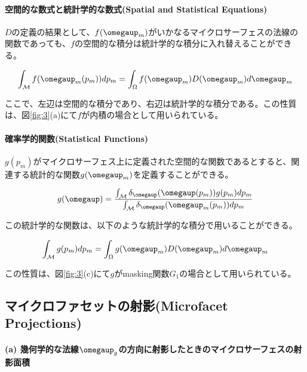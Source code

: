 \documentclass[a4j,xelatex,ja=standard]{bxjsarticle}
\begin{document}
\paragraph{空間的な数式と統計学的な数式(Spatial and Statistical Equations)}

$D$の定義の結果として、$f(\boldsymbol{\omegaup}_m)$がいかなるマイクロサーフェスの法線の関数であっても、$f$の空間的な積分は統計学的な積分に入れ替えることができる。

\begin{equation}
    \int_{\mathcal M} f(\boldsymbol{\omegaup}_m(p_m))dp_m = \int_{\Omega}f(\boldsymbol{\omegaup}_m) D(\boldsymbol{\omegaup}_m)d\boldsymbol{\omegaup}_m
    \label{eq:6}
\end{equation}

ここで、左辺は空間的な積分であり、右辺は統計学的な積分である。この性質は、図\ref{fig:3}(a)にて$f$が内積の場合として用いられている。

\paragraph{確率学的関数(Statistical Functions)}

$g(p_m)$がマイクロサーフェス上に定義された空間的な関数であるとすると、関連する統計的な関数$g(\boldsymbol{\omegaup}_m)$を定義することができる。

\begin{equation}
    g(\boldsymbol{\omegaup}) = \frac{\int_{\mathcal M} \delta_{\boldsymbol{\omegaup}}(\boldsymbol{\omegaup}(p_m)) g(p_m) dp_m}{\int_{\mathcal M} \delta_{\boldsymbol{\omegaup}}(\boldsymbol{\omegaup}_m(p_m)) dp_m}
    \label{eq:7}
\end{equation}

この統計学的な関数は、以下のような統計学的な積分で用いることができる。

\begin{equation}
    \int_{\mathcal M} g(p_m)dp_m = \int_{\Omega}g(\boldsymbol{\omegaup}_m) D(\boldsymbol{\omegaup}_m)d\boldsymbol{\omegaup}_m
    \label{eq:8}
\end{equation}

この性質は、図\ref{fig:3}(c)にて$g$がmasking関数$G_1$の場合として用いられている。

\subsection{マイクロファセットの射影(Microfacet Projections)}

\paragraph{(a) 幾何学的な法線$\boldsymbol{\omegaup}_g$の方向に射影したときのマイクロサーフェスの射影面積}
\end{document}
